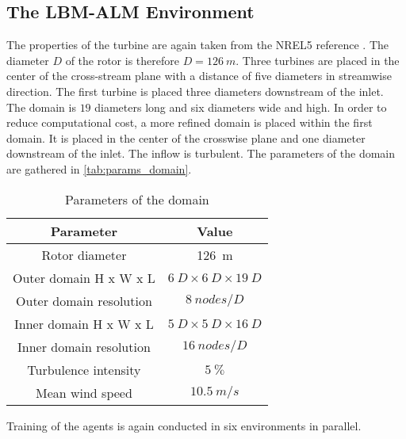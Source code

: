 \subsection{The LBM-ALM Environment}
\label{ssec:LBM_ALM_env}
The properties of the turbine are again taken from the NREL5 reference \cite{jonkman_definition_2009}. The diameter $D$ of the rotor is therefore $D=\SI{126}{m}$. Three turbines are placed in the center of the cross-stream plane with a distance of five diameters in streamwise direction. The first turbine is placed three diameters downstream of the inlet. The domain is $19$ diameters long and six diameters wide and high. In order to reduce computational cost, a more refined domain is placed within the first domain. It is placed in the center of the crosswise plane and one diameter downstream of the inlet. The inflow is turbulent. The parameters of the domain are gathered in \autoref{tab:params_domain}. \\
\begin{table}[h]
	\centering
	\caption{Parameters of the domain}
	\begin{tabular}{cc}
	\toprule
	Parameter & Value \\ 
	\midrule
	Rotor diameter & \SI{126}{m} \\ 
	Outer domain H x W x L & $\SI{6}{D} \times \SI{6}{D} \times \SI{19}{D}$ \\ 
	Outer domain resolution & $\SI{8}{nodes/D}$ \\ 
	Inner domain H x W x L & $\SI{5}{D} \times \SI{5}{D} \times \SI{16}{D}$ \\ 
	Inner domain resolution & $\SI{16}{nodes/D}$ \\ 
	Turbulence intensity & $\SI{5}{\percent} $ \\ 
	Mean wind speed & $\SI{10.5}{m/s} $ \\
	\bottomrule
	\end{tabular}
	\label{tab:params_domain}
\end{table}
Training of the agents is again conducted in six environments in parallel.

